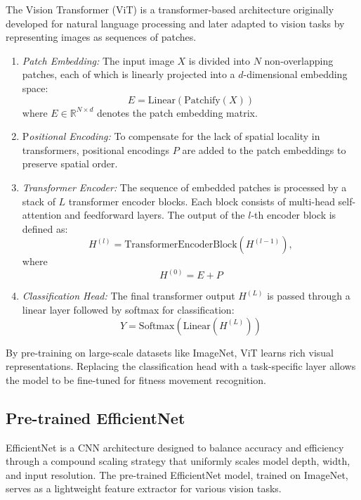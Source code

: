 \documentclass[conference]{IEEEtran}
\begin{document}
The Vision Transformer (ViT) is a transformer-based architecture originally developed for natural language processing and later adapted to vision tasks by representing images as sequences of patches.
\begin{enumerate}
\item \textit{Patch Embedding: }The input image $X$ is divided into $N$ non-overlapping patches, each of which is linearly projected into a $d$-dimensional embedding space:
\begin{equation}
E = \text{Linear}(\text{Patchify}(X))
\end{equation}
where $E \in \mathbb{R}^{N \times d}$ denotes the patch embedding matrix.

\item P\textit{ositional Encoding:} To compensate for the lack of spatial locality in transformers, positional encodings $P$ are added to the patch embeddings to preserve spatial order.

\item \textit{Transformer Encoder:} The sequence of embedded patches is processed by a stack of $L$ transformer encoder blocks. Each block consists of multi-head self-attention and feedforward layers. The output of the $l$-th encoder block is defined as:
\begin{equation}
H^{(l)} = \text{TransformerEncoderBlock}(H^{(l-1)}),
\end{equation}
where \begin{equation} 
H^{(0)} = E + P 
\end{equation}

\item \textit{Classification Head:} The final transformer output $H^{(L)}$ is passed through a linear layer followed by softmax for classification:
\begin{equation}
Y = \text{Softmax}(\text{Linear}(H^{(L)}))
\end{equation}
\end{enumerate}
By pre-training on large-scale datasets like ImageNet, ViT learns rich visual representations. Replacing the classification head with a task-specific layer allows the model to be fine-tuned for fitness movement recognition.

\subsection{Pre-trained EfficientNet}

EfficientNet is a CNN architecture designed to balance accuracy and efficiency through a compound scaling strategy that uniformly scales model depth, width, and input resolution. The pre-trained EfficientNet model, trained on ImageNet, serves as a lightweight feature extractor for various vision tasks.
\end{document}

